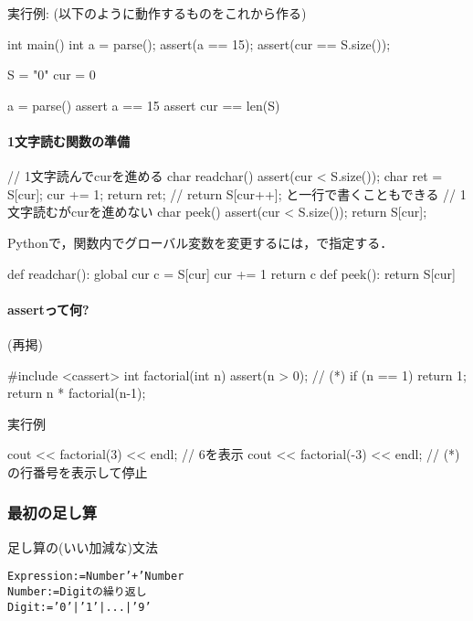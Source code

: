 実行例: (以下のように動作するものをこれから作る)
\begin{cbox}
int main() {
  int a = parse();
  assert(a == 15);
  assert(cur == S.size());
}  
\end{cbox}

\begin{pybox}
S = "0"
cur = 0

a = parse()
assert a == 15
assert cur == len(S)
\end{pybox}

\paragraph{1文字読む関数の準備}

\begin{cbox}[emph={readchar,peek}]
// 1文字読んでcurを進める
char readchar() { 
  assert(cur < S.size());    
  char ret = S[cur];
  cur += 1;
  return ret;
  // return S[cur++]; と一行で書くこともできる
}
// 1文字読むがcurを進めない
char peek() { 
  assert(cur < S.size());    
  return S[cur];
}
\end{cbox}

Pythonで，関数内でグローバル変数を変更するには，で指定する．
\begin{pybox}[emph=global]
def readchar():
    global cur
    c = S[cur]
    cur += 1
    return c
def peek():
    return S[cur]
\end{pybox}

\paragraph{assertって何?} 
(再掲)
\begin{cbox}[emph={cassert,assert}]
#include <cassert>
int factorial(int n) {
  assert(n > 0); // (*)
  if (n == 1) return 1;
  return n * factorial(n-1);
}     
\end{cbox}

実行例
\begin{cbox}
cout << factorial(3) << endl; // 6を表示
cout << factorial(-3) << endl; // (*)の行番号を表示して停止
\end{cbox}

\subsubsection{最初の足し算}

\begin{itembox}[l]{足し算の(いい加減な)文法}
  \begin{alltt}
Expression := Number '+' Number
Number := Digitの繰り返し
Digit := '0' | '1' | ... | '9'\end{alltt}  
\end{itembox}

